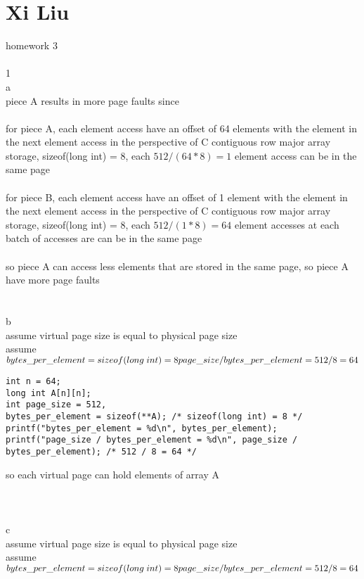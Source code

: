 \documentclass[12pt, border = 4pt, multi]{article} %
\begin{document}
\section*{Xi Liu}
homework 3\\
\\
1\\
a\\
piece A results in more page faults since\\
\\
for piece A, each element access have an offset of 64 elements with the element in the next element access in the perspective of C contiguous row major array storage, sizeof(long int) = 8, each $512 / (64 * 8) = 1$ element access can be in the same page\\
\\
for piece B, each element access have an offset of 1 element with the element in the next element access in the perspective of C contiguous row major array storage, sizeof(long int) = 8, each $512 / (1 * 8) = 64$ element accesses at each batch of accesses are can be in the same page\\
\\
so piece A can access less elements that are stored in the same page, so piece A have more page faults\\
\\
\\
b\\
assume virtual page size is equal to physical page size\\
assume $bytes\_per\_element = sizeof(long\;int) = 8\\
page\_size / bytes\_per\_element = 512 / 8 = 64$
\begin{lstlisting}
int n = 64;
long int A[n][n];
int page_size = 512,
bytes_per_element = sizeof(**A); /* sizeof(long int) = 8 */
printf("bytes_per_element = %d\n", bytes_per_element);
printf("page_size / bytes_per_element = %d\n", page_size / bytes_per_element); /* 512 / 8 = 64 */
\end{lstlisting}
so each virtual page can hold  elements of array A\\
\\
\\
\\
c\\
assume virtual page size is equal to physical page size\\
assume $bytes\_per\_element = sizeof(long\;int) = 8\\
page\_size / bytes\_per\_element = 512 / 8 = 64$
\end{document}
